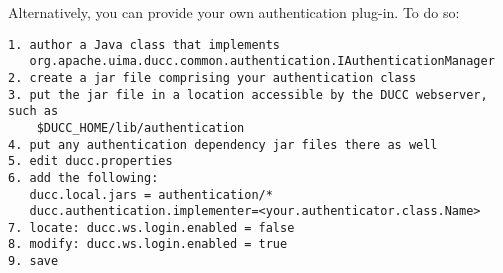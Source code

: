     Alternatively, you can provide your own authentication plug-in.  To do so:
\begin{verbatim}    
1. author a Java class that implements 
   org.apache.uima.ducc.common.authentication.IAuthenticationManager
2. create a jar file comprising your authentication class
3. put the jar file in a location accessible by the DUCC webserver, such as 
    $DUCC_HOME/lib/authentication
4. put any authentication dependency jar files there as well
5. edit ducc.properties
6. add the following:
   ducc.local.jars = authentication/*
   ducc.authentication.implementer=<your.authenticator.class.Name>
7. locate: ducc.ws.login.enabled = false
8. modify: ducc.ws.login.enabled = true
9. save   
\end{verbatim}    

